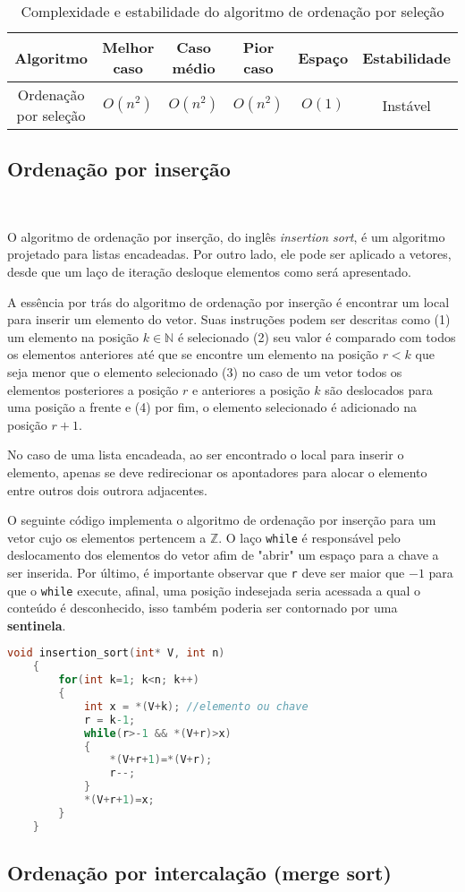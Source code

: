\begin{table}[h]
  \centering
  \label{tab:bubble-sort}
  \begin{tabular}{|c|c|c|c|c|c|}
    \hline
    \textbf{Algoritmo} & \textbf{Melhor caso} & \textbf{Caso médio} & \textbf{Pior caso} & \textbf{Espaço}& \textbf{Estabilidade} \\ \hline
    Ordenação por seleção       & \( O(n^2) \)           & \( O(n^2) \)         & \( O(n^2) \)        & \(O(1)\) & Instável              \\ \hline
  \end{tabular}
  \caption{Complexidade e estabilidade do algoritmo de ordenação por seleção}
\end{table}


\subsection{Ordenação por inserção}
\ 

O algoritmo de ordenação por inserção, do inglês \textit{insertion sort}, é um algoritmo projetado para listas encadeadas. Por outro lado, ele pode ser aplicado a vetores, desde que um laço de iteração desloque elementos como será apresentado.

A essência por trás do algoritmo de ordenação por inserção é encontrar um local para inserir um elemento do vetor. Suas instruções podem ser descritas como (1) um elemento na posição $k \in \mathbb{N}$ é selecionado (2) seu valor é comparado com todos os elementos anteriores até que se encontre um elemento na posição $r<k$ que seja menor que o elemento selecionado (3) no caso de um vetor todos os elementos posteriores a posição $r$ e anteriores a posição $k$ são deslocados para uma posição a frente e (4) por fim, o elemento selecionado é adicionado na posição $r+1$.

No caso de uma lista encadeada, ao ser encontrado o local para inserir o elemento, apenas se deve redirecionar os apontadores para alocar o elemento entre outros dois outrora adjacentes.

O seguinte código implementa o algoritmo de ordenação por inserção para um vetor cujo os elementos pertencem a $\mathbb{Z}$. O laço \texttt{while} é responsável pelo deslocamento dos elementos do vetor afim de "abrir" um espaço para a chave a ser inserida. Por último, é importante observar que \texttt{r} deve ser maior que $-1$ para que o \texttt{while} execute, afinal, uma posição indesejada seria acessada a qual o conteúdo é desconhecido, isso também poderia ser contornado por uma \textbf{sentinela}.

\begin{lstlisting}[language=C, frame=single]
    void insertion_sort(int* V, int n)
    {
        for(int k=1; k<n; k++)
        {
            int x = *(V+k); //elemento ou chave
            r = k-1;
            while(r>-1 && *(V+r)>x)
            {
                *(V+r+1)=*(V+r);
                r--;
            }
            *(V+r+1)=x;
        }
    }
\end{lstlisting}

\subsection{Ordenação por intercalação (merge sort)}